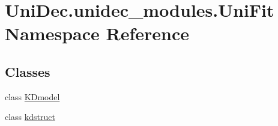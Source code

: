 \hypertarget{namespace_uni_dec_1_1unidec__modules_1_1_uni_fit}{}\section{Uni\+Dec.\+unidec\+\_\+modules.\+Uni\+Fit Namespace Reference}
\label{namespace_uni_dec_1_1unidec__modules_1_1_uni_fit}
\subsection*{Classes}
\begin{DoxyCompactItemize}
\item 
class \hyperlink{class_uni_dec_1_1unidec__modules_1_1_uni_fit_1_1_k_dmodel}{K\+Dmodel}
\item 
class \hyperlink{class_uni_dec_1_1unidec__modules_1_1_uni_fit_1_1kdstruct}{kdstruct}
\end{DoxyCompactItemize}

